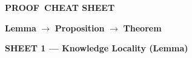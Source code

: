 \documentclass[10pt]{article}
\begin{document}
\begin{minipage}[c]{0.60\textwidth}
  {\fontsize{22}{24}\selectfont\bfseries\textcolor{marine}{PROOF}~CHEAT SHEET}
\end{minipage}\hfill
\begin{minipage}[c]{0.38\textwidth}\raggedleft\small
  \textbf{Lemma} $\to$ \textbf{Proposition} $\to$ \textbf{Theorem}
\end{minipage}

\vspace{6pt}

{\large\bfseries\textcolor{marine}{SHEET 1 --- Knowledge Locality (Lemma)}}\par\vspace{2pt}
\end{document}
